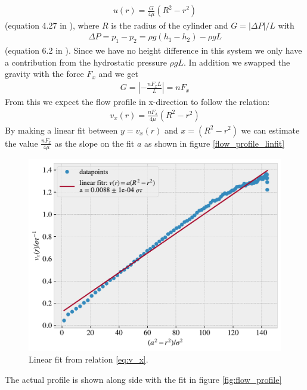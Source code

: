 \documentclass[reprint, amsmath, amssymb, aps]{revtex4-2}
\begin{document}
\begin{align*}
  u(r) = \frac{G}{4\mu}(R^2 - r^2)
\end{align*}
(equation 4.27 in \cite{compendium}), where $R$ is the radius of the cylinder and $G = |\Delta P|/L$ with
\begin{align*}
  \Delta P = p_1 - p_2 = \rho g (h_1 - h_2) - \rho g L
\end{align*}
(equation 6.2 in \cite{compendium}). Since we have no height difference in this system we only have a contribution from the hydrostatic pressure $\rho gL$. In addition we swapped the gravity with the force $F_x$ and we get
\begin{align*}
  G = |-\frac{nF_xL}{L}| = nF_x
\end{align*}
From this we expect the flow profile in x-direction to follow the relation:
\begin{align}
  v_x(r) = \frac{nF_x}{4\mu}(R^2 - r^2)
  \label{eq:v_x}
\end{align}
By making a linear fit between $y = v_x(r)$ and $x = (R^2 - r^2)$ we can estimate the value $\frac{nF_x}{4\mu}$ as the slope on the fit $a$ as shown in figure \ref{flow_profile_linfit}
\begin{figure}[H]
  \includegraphics[width=\linewidth]{figures/flow_profile_linfit.pdf}
  \caption{Linear fit from relation \ref{eq:v_x}.}
  \label{fig:flow_profile_linfit}
\end{figure}
The actual profile is shown along side with the fit in figure \ref{fig:flow_profile}
\end{document}
